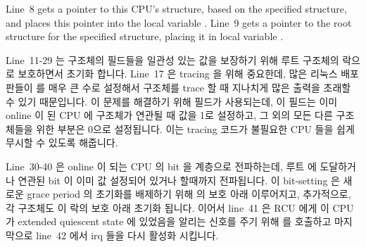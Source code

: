 Line~8 gets a pointer to this CPU's  structure, based
on the specified  structure, and places this pointer
into the local variable .
Line~9 gets a pointer to the root  structure for the
specified  structure, placing it in local variable
.
\fi

Line~11-29 는  구조체의 필드들을 일관성 있는 값을 보장하기 위해
루트  구조체의 락으로 보호하면서 초기화 합니다.
Line~17 은 tracing 을 위해 중요한데, 많은 리눅스 배포판들이  를
매우 큰 수로 설정해서  구조체를 trace 할 때 지나치게 많은 출력을
초래할 수 있기 때문입니다.
이 문제를 해결하기 위해  필드가 사용되는데, 이 필드는 이미
online 이 된 CPU 에  구조체가 연관될 때 값을 1로 설정하고, 그 외의
모든 다른  구조체들을 위한 부분은 0으로 설정됩니다.
이는 tracing 코드가 불필요한 CPU 들을 쉽게 무시할 수 있도록 해줍니다.
\iffalse

Lines~11-29 initialize the fields of the \co{rcu_data} structure
under the protection of the root \co{rcu_node} structure's lock
in order to ensure consistent values.
Line~17 is important for tracing, due to the fact that many Linux
distributions set \co{NR_CPUS} to a very large number, which could
result in excessive output when tracing \co{rcu_data} structures.
The \co{->beenonline} field is used to solve this problem, as
it will be set to the value one on any \co{rcu_data} structure
corresponding to a CPU that has ever been online, and set to zero
for all other \co{rcu_data} structures.
This allows the tracing code to easily ignore irrelevant CPUs.
\fi

Line~30-40 은 online 이 되는 CPU 의 bit 을  계층으로 전파하는데,
루트  에 도달하거나 연관된 bit 이 이미 값 설정되어 있거나 할때까지
전파됩니다.
이 bit-setting 은 새로운 grace period 의 초기화를 배제하기 위해
 의 보호 아래 이루어지고, 추가적으로, 각  구조체도
이 락의 보호 아래 초기화 됩니다.
이어서 line~41 은 RCU 에게 이 CPU 가 extended quiescent state 에 있었음을
알리는 신호를 주기 위해  를 호출하고 마지막으로 line~42 에서
irq 들을 다시 활성화 시킵니다.
\iffalse

Lines~30-40 propagate the onlining CPU's bit up the \co{rcu_node}
hierarchy, proceeding until either the root \co{rcu_node} is
reached or until the corresponding bit is already set, whichever
comes first.
This bit-setting is done under the protection of \co{->onofflock}
in order to exclude initialization of a new grace period, and, in addition,
each \co{rcu_node} structure is initialized under the protection
of its lock.
Line~41 then invokes \co{cpu_quiet()} to signal RCU that this
CPU has been in an extended quiescent state, and finally, line~42
re-enables irqs.
\fi

